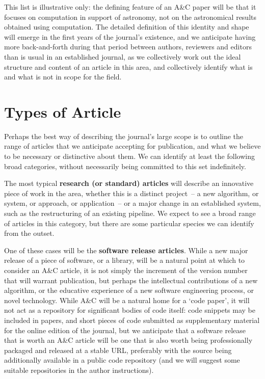 This list is illustrative only: the defining feature of an A\&C paper will be that it focuses on computation in support of astronomy, not on the astronomical results obtained using computation. 
The detailed definition of this identity and shape will emerge in the first years of the
journal's existence, and we anticipate having more back-and-forth
during that period between authors, reviewers and editors than is usual in an
established journal, as we collectively work out the ideal structure
and content of an article in this area, and collectively identify what
is and what is not in scope for the field.



\section{Types of Article}
\label{types}

Perhaps the best way of describing the journal's large scope is to
outline the range of articles that we anticipate accepting for publication,
and what we believe to be necessary or distinctive about them.  We
can identify at least the following broad categories, without necessarily being
committed to this set indefinitely.

The most typical \textbf{research (or standard) articles} will describe an
innovative piece of work in the area, whether this
is a distinct project~-- a new algorithm, or system, or approach, or
application~-- or a major change in an established system, such as the
restructuring of an existing pipeline.  We expect to see a broad range
of articles in this category, but there are some particular species we
can identify from the outset.

One of these cases will be the \textbf{software release
articles}.   While a new major release of a piece of software, or a
library, will be a natural point at which to consider an A\&C article,
it is not simply the increment of the version number that will
warrant publication, but perhaps the intellectual contributions of a
new algorithm, or the educative experience of a new software
engineering process, or novel technology. While A\&C will be a natural home for a `code
paper', it will not act as a repository for significant bodies of code itself: code snippets may
be included in papers, and short pieces of code submitted as supplementary material for the online edition of the journal, but  we anticipate that a software release that is
worth an A\&C article will be one that is also worth being professionally packaged and
released at a stable URL, preferably with the source being additionally
available in a public code repository (and we will suggest some suitable
repositories in the author instructions).  

